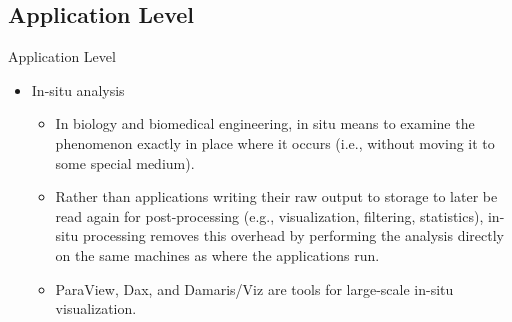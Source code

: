 \documentclass[compress,11pt,xcolor=svgnames,aspectratio=169]{beamer}
\begin{document}
\subsection{Application Level}

\begin{frame}[fragile]{Application Level}

\begin{itemize}

\item In-situ analysis\\[0.4cm]

    \begin{itemize}
    \setlength\itemsep{0.6cm}

    \item In biology and biomedical engineering, in situ means to examine the phenomenon exactly in place where it occurs (i.e., without moving it to some special medium).

    \item Rather than applications writing their raw output to storage to later be read again for post-processing (e.g., visualization, filtering, statistics), in-situ processing removes this overhead by performing the analysis directly on the same machines as where the applications run.

    \item ParaView, Dax, and Damaris/Viz are tools for large-scale in-situ visualization.

    \end{itemize}

\end{itemize}

\nocite{3372390}

\end{frame}
\end{document}
